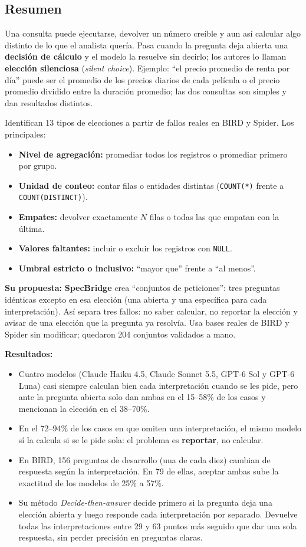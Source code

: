 \documentclass[11pt,a4paper]{article}
\begin{document}
\subsection*{Resumen}
Una consulta puede ejecutarse, devolver un número creíble y aun así calcular algo distinto de lo que el analista quería. Pasa cuando la pregunta deja abierta una \textbf{decisión de cálculo} y el modelo la resuelve sin decirlo; los autores lo llaman \textbf{elección silenciosa} (\textit{silent choice}). Ejemplo: ``el precio promedio de renta por día'' puede ser el promedio de los precios diarios de cada película o el precio promedio dividido entre la duración promedio; las dos consultas son simples y dan resultados distintos.

Identifican 13 tipos de elecciones a partir de fallos reales en BIRD y Spider. Los principales:
\begin{itemize}
  \item \textbf{Nivel de agregación:} promediar todos los registros o promediar primero por grupo.
  \item \textbf{Unidad de conteo:} contar filas o entidades distintas (\texttt{COUNT(*)} frente a \texttt{COUNT(DISTINCT)}).
  \item \textbf{Empates:} devolver exactamente $N$ filas o todas las que empatan con la última.
  \item \textbf{Valores faltantes:} incluir o excluir los registros con \texttt{NULL}.
  \item \textbf{Umbral estricto o inclusivo:} ``mayor que'' frente a ``al menos''.
\end{itemize}

\textbf{Su propuesta:} \textbf{SpecBridge} crea ``conjuntos de peticiones'': tres preguntas idénticas excepto en esa elección (una abierta y una específica para cada interpretación). Así separa tres fallos: no saber calcular, no reportar la elección y avisar de una elección que la pregunta ya resolvía. Usa bases reales de BIRD y Spider sin modificar; quedaron 204 conjuntos validados a mano.

\textbf{Resultados:}
\begin{itemize}
  \item Cuatro modelos (Claude Haiku 4.5, Claude Sonnet 5.5, GPT-6 Sol y GPT-6 Luna) casi siempre calculan bien cada interpretación cuando se les pide, pero ante la pregunta abierta solo dan ambas en el 15--58\% de los casos y mencionan la elección en el 38--70\%.
  \item En el 72--94\% de los casos en que omiten una interpretación, el mismo modelo sí la calcula si se le pide sola: el problema es \textbf{reportar}, no calcular.
  \item En BIRD, 156 preguntas de desarrollo (una de cada diez) cambian de respuesta según la interpretación. En 79 de ellas, aceptar ambas sube la exactitud de los modelos de 25\% a 57\%.
  \item Su método \textit{Decide-then-answer} decide primero si la pregunta deja una elección abierta y luego responde cada interpretación por separado. Devuelve todas las interpretaciones entre 29 y 63 puntos más seguido que dar una sola respuesta, sin perder precisión en preguntas claras.
\end{itemize}
\end{document}
